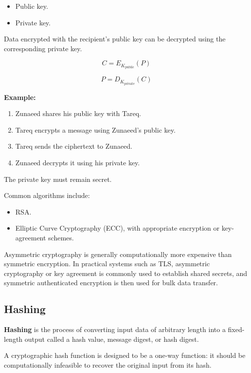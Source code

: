 \begin{itemize}
\item Public key.
\item Private key.
\end{itemize}

Data encrypted with the recipient's public key can be decrypted using the corresponding private key.



\[
C=E_{K_{\text{public}}}(P)
\]





\[
P=D_{K_{\text{private}}}(C)
\]



\textbf{Example:}

\begin{enumerate}
\item Zunaeed shares his public key with Tareq.
\item Tareq encrypts a message using Zunaeed's public key.
\item Tareq sends the ciphertext to Zunaeed.
\item Zunaeed decrypts it using his private key.
\end{enumerate}

The private key must remain secret.

Common algorithms include:

\begin{itemize}
\item RSA.
\item Elliptic Curve Cryptography (ECC), with appropriate encryption or key-agreement schemes.
\end{itemize}

Asymmetric cryptography is generally computationally more expensive than symmetric encryption. In practical systems such as TLS, asymmetric cryptography or key agreement is commonly used to establish shared secrets, and symmetric authenticated encryption is then used for bulk data transfer.

\subsection{Hashing}

\textbf{Hashing} is the process of converting input data of arbitrary length into a fixed-length output called a hash value, message digest, or hash digest.

A cryptographic hash function is designed to be a one-way function: it should be computationally infeasible to recover the original input from its hash.




